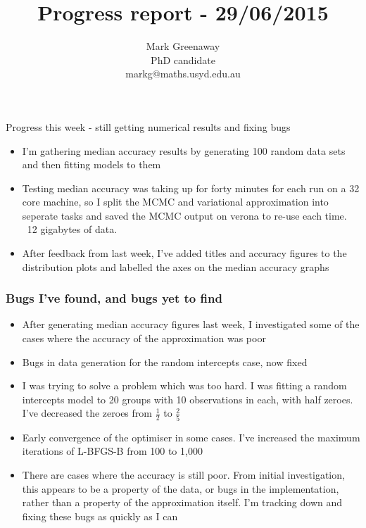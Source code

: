 \documentclass{beamer}
\title{Progress report - 29/06/2015}
\author{Mark Greenaway\\PhD candidate\\markg@maths.usyd.edu.au}
\begin{document}
\begin{frame}
\maketitle
\end{frame}

\begin{frame}{Progress this week - still getting numerical results and fixing bugs}
\begin{itemize}
\item I'm gathering median accuracy results by generating 100 random data sets and then fitting
			models to them
\item Testing median accuracy was taking up for forty minutes for each run on a 32 core machine,
			so I split the MCMC and variational approximation into seperate tasks and saved the MCMC 
			output on verona to re-use each time. ~12 gigabytes of data.
\item After feedback from last week, I've added titles and accuracy figures to the distribution
			plots and labelled the axes on the median accuracy graphs
\end{itemize}

\end{frame}

\begin{frame}
\frametitle{Bugs I've found, and bugs yet to find}
\begin{itemize}
\item After generating median accuracy figures last week, I investigated some of the cases where 				the accuracy of the approximation was poor
\item Bugs in data generation for the random intercepts case, now fixed
\item I was trying to solve a problem which was too hard. I was fitting a random intercepts
			model to 20 groups with 10 observations in each, with half zeroes.
			I've decreased the zeroes from $\frac{1}{2}$ to $\frac{2}{5}$
\item Early convergence of the optimiser in some cases. I've increased the maximum iterations
			of L-BFGS-B from 100 to 1,000
\item There are cases where the accuracy is still poor. From initial investigation, this appears to
			be a property of the data, or bugs in the implementation, rather than a property of the
			approximation itself. I'm tracking down and fixing these bugs as quickly as I can
\end{itemize}
\end{frame}
\end{document}
